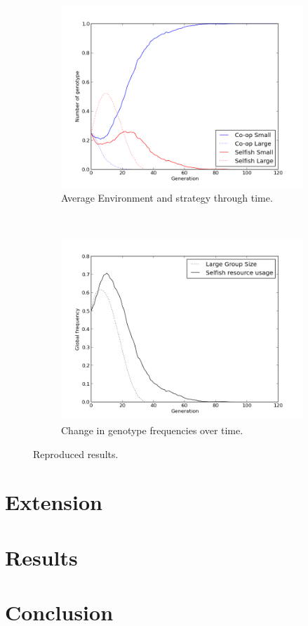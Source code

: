 \documentclass[11pt]{ecsarticle}
\begin{document}
\begin{figure}
        \centering
        \begin{subfigure}[b]{0.4\textwidth}
                \includegraphics[width=\textwidth]{Code2/fig1.png}
                \caption{Average Environment and strategy through time.}
                \label{fig:rep:A}
        \end{subfigure}%
        ~ %
        \begin{subfigure}[b]{0.4\textwidth}
                \includegraphics[width=\textwidth]{Code2/fig2.png}
                \caption{Change in genotype frequencies over time.}
                \label{fig:rep:B}
        \end{subfigure}
        \caption{Reproduced results.}\label{fig:animals}
\end{figure}
\section{Extension}

\section{Results}

\section{Conclusion}




 
\end{document}
